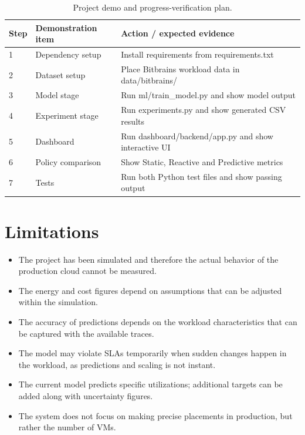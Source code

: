 \documentclass[10pt,journal,compsoc]{IEEEtran}
\begin{document}
\begin{table}[htbp]
\caption{Project demo and progress-verification plan.}
\centering
\begin{tabular}{|p{0.6cm}|p{2.3cm}|p{4.7cm}|}
\hline
\textbf{Step} & \textbf{Demonstration item} & \textbf{Action / expected evidence} \\ \hline
1 & Dependency setup & Install requirements from requirements.txt \\ \hline
2 & Dataset setup & Place Bitbrains workload data in data/bitbrains/ \\ \hline
3 & Model stage & Run ml/train\_model.py and show model output \\ \hline
4 & Experiment stage & Run experiments.py and show generated CSV results \\ \hline
5 & Dashboard & Run dashboard/backend/app.py and show interactive UI \\ \hline
6 & Policy comparison & Show Static, Reactive and Predictive metrics \\ \hline
7 & Tests & Run both Python test files and show passing output \\ \hline
\end{tabular}
\label{tab:demo_plan}
\end{table}

\section{Limitations}
\begin{itemize}
    \item The project has been simulated and therefore the actual behavior of the production cloud cannot be measured.
    \item The energy and cost figures depend on assumptions that can be adjusted within the simulation.
    \item The accuracy of predictions depends on the workload characteristics that can be captured with the available traces.
    \item The model may violate SLAs temporarily when sudden changes happen in the workload, as predictions and scaling is not instant.
    \item The current model predicts specific utilizations; additional targets can be added along with uncertainty figures.
    \item The system does not focus on making precise placements in production, but rather the number of VMs.
\end{itemize}
\end{document}
